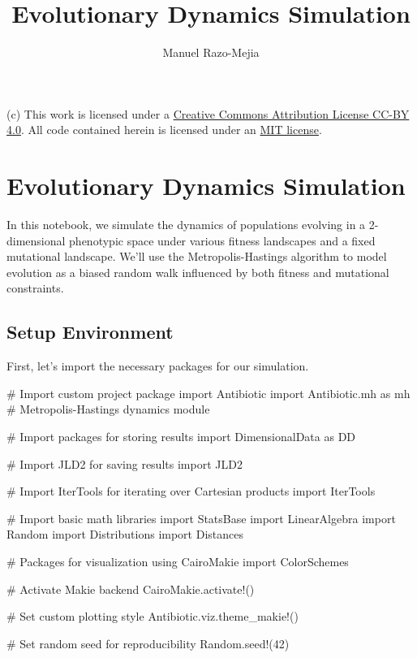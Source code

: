 \documentclass[
]{scrartcl}
\title{Evolutionary Dynamics Simulation}
\author[1]{Manuel Razo-Mejia}
\affil[1]{Department of Biology, Stanford University}
\date{}
\newenvironment{Shaded}{\begin{snugshade}}{\end{snugshade}}
\newcommand{\BuiltInTok}[1]{\textcolor[rgb]{0.00,0.23,0.31}{#1}}
\newcommand{\CommentTok}[1]{\textcolor[rgb]{0.37,0.37,0.37}{#1}}
\newcommand{\FloatTok}[1]{\textcolor[rgb]{0.68,0.00,0.00}{#1}}
\newcommand{\FunctionTok}[1]{\textcolor[rgb]{0.28,0.35,0.67}{#1}}
\newcommand{\ImportTok}[1]{\textcolor[rgb]{0.00,0.46,0.62}{#1}}
\newcommand{\NormalTok}[1]{\textcolor[rgb]{0.00,0.23,0.31}{#1}}
\begin{document}
\linenumbers
\maketitle
(c) This work is licensed under a
\href{https://creativecommons.org/licenses/by/4.0/}{Creative Commons
Attribution License CC-BY 4.0}. All code contained herein is licensed
under an \href{https://opensource.org/licenses/MIT}{MIT license}.

\section{Evolutionary Dynamics
Simulation}\label{evolutionary-dynamics-simulation}

In this notebook, we simulate the dynamics of populations evolving in a
2-dimensional phenotypic space under various fitness landscapes and a
fixed mutational landscape. We'll use the Metropolis-Hastings algorithm
to model evolution as a biased random walk influenced by both fitness
and mutational constraints.

\subsection{Setup Environment}\label{setup-environment}

First, let's import the necessary packages for our simulation.

\begin{Shaded}
\begin{Highlighting}[]
\CommentTok{\# Import custom project package}
\ImportTok{import} \BuiltInTok{Antibiotic}
\ImportTok{import} \BuiltInTok{Antibiotic.mh}\NormalTok{ as mh }\CommentTok{\# Metropolis{-}Hastings dynamics module}

\CommentTok{\# Import packages for storing results}
\ImportTok{import} \BuiltInTok{DimensionalData}\NormalTok{ as DD}

\CommentTok{\# Import JLD2 for saving results}
\ImportTok{import} \BuiltInTok{JLD2}

\CommentTok{\# Import IterTools for iterating over Cartesian products}
\ImportTok{import} \BuiltInTok{IterTools}

\CommentTok{\# Import basic math libraries}
\ImportTok{import} \BuiltInTok{StatsBase}
\ImportTok{import} \BuiltInTok{LinearAlgebra}
\ImportTok{import} \BuiltInTok{Random}
\ImportTok{import} \BuiltInTok{Distributions}
\ImportTok{import} \BuiltInTok{Distances}

\CommentTok{\# Packages for visualization}
\ImportTok{using} \BuiltInTok{CairoMakie}
\ImportTok{import} \BuiltInTok{ColorSchemes}

\CommentTok{\# Activate Makie backend}
\NormalTok{CairoMakie.}\FunctionTok{activate!}\NormalTok{()}

\CommentTok{\# Set custom plotting style}
\NormalTok{Antibiotic.viz.}\FunctionTok{theme\_makie!}\NormalTok{()}

\CommentTok{\# Set random seed for reproducibility}
\BuiltInTok{Random}\NormalTok{.}\FunctionTok{seed!}\NormalTok{(}\FloatTok{42}\NormalTok{)}
\end{Highlighting}
\end{Shaded}
\end{document}
